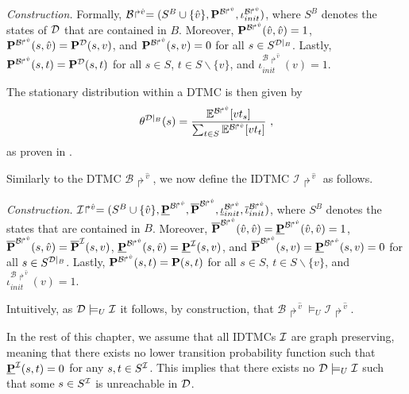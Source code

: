 \emph{Construction.} Formally, $\mathcal{B}\!\Rsh^{\hat{v}} = (S^{B} \cup \{\hat{v}\},\mathbf{P}^{\mathcal{B}\Rsh^{\hat{v}}},\iota_{init}^{\mathcal{B}\Rsh^{\hat{v}}})$, where $S^B$ denotes the states of $\mathcal{D}$ that are contained in $B$. Moreover, $\mathbf{P}^{\mathcal{B}\Rsh^{\hat{v}}}(\hat{v},\hat{v}) = 1$, $\mathbf{P}^{\mathcal{B}\Rsh^{\hat{v}}}(s,\hat{v}) = \mathbf{P}^{\mathcal{D}}(s,v)$, and $\mathbf{P}^{\mathcal{B}\Rsh^{\hat{v}}}(s,v) = 0$ for all $s\in S^{\mathcal{D}|_B}$. Lastly, $\mathbf{P}^{\mathcal{B}\Rsh^{\hat{v}}}(s,t) = \mathbf{P}^{\mathcal{D}}(s,t)$ for all $s\in S$, $t\in S\backslash\{v\}$, and $\iota_{init}^{\mathcal{B}\Rsh^{\hat{v}}}(v) = 1$. 

The stationary distribution within a DTMC is then given by
\begin{equation}\label{eq:Stat_Distr_of_BSCC}
    \theta^{\mathcal{D}|_B}(s) = \frac{\mathbb{E}^{\mathcal{B}\Rsh^{\hat{v}}}[vt_s]}{\sum_{t\in S}\mathbb{E}^{\mathcal{B}\Rsh^{\hat{v}}}[vt_t]}\ ,
\end{equation}
as proven in \cite{Computing_EVTs_Stationary_Distr_in_MCs_Mertens}.

Similarly to the DTMC $\mathcal{B}\!\Rsh^{\hat{v}}$, we now define the IDTMC $\mathcal{I}\!\Rsh^{\hat{v}}$ as follows.

\emph{Construction.} $\mathcal{I}\!\Rsh^{\hat{v}} = (S^{B} \cup \{\hat{v}\},\mathbf{\underline{P}}^{\mathcal{B}\Rsh^{\hat{v}}},\mathbf{\overline{P}}^{\mathcal{B}\Rsh^{\hat{v}}},\mathbf{\underline{\iota}}_{init}^{\mathcal{B}\Rsh^{\hat{v}}},\mathbf{\overline{\iota}}_{init}^{\mathcal{B}\Rsh^{\hat{v}}})$, where $S^B$ denotes the states that are contained in $B$. Moreover, $\mathbf{\overline{P}}^{\mathcal{B}\Rsh^{\hat{v}}}(\hat{v},\hat{v}) = \mathbf{\underline{P}}^{\mathcal{B}\Rsh^{\hat{v}}}(\hat{v},\hat{v}) = 1$, $\mathbf{\overline{P}}^{\mathcal{B}\Rsh^{\hat{v}}}(s,\hat{v}) = \mathbf{\overline{P}}^{\mathcal{I}}(s,v)$, $\mathbf{\underline{P}}^{\mathcal{B}\Rsh^{\hat{v}}}(s,\hat{v}) = \mathbf{\underline{P}}^{\mathcal{I}}(s,v)$, and $\mathbf{\overline{P}}^{\mathcal{B}\Rsh^{\hat{v}}}(s,v) = \mathbf{\underline{P}}^{\mathcal{B}\Rsh^{\hat{v}}}(s,v) = 0$ for all $s\in S^{\mathcal{D}|_B}$. Lastly, $\mathbf{P}^{\mathcal{B}\Rsh^{\hat{v}}}(s,t) = \mathbf{P}(s,t)$ for all $s\in S$, $t\in S\backslash\{v\}$, and $\iota_{init}^{\mathcal{B}\Rsh^{\hat{v}}}(v) = 1$. 

Intuitively, as $\mathcal{D} \models_U \mathcal{I}$ it follows, by construction, that $\mathcal{B}\!\Rsh^{\hat{v}} \models_U \mathcal{I}\!\Rsh^{\hat{v}}$.


\begin{assumption}\label{assmp:graph_preserving}
    In the rest of this chapter, we assume that all IDTMCs $\mathcal{I}$ are graph preserving, meaning that there exists no lower transition probability function such that $\mathbf{\underline{P}}^{\mathcal{I}}(s,t) = 0$ for any $s,t\in S^{\mathcal{I}}$. This implies that there exists no $\mathcal{D} \models_U \mathcal{I}$ such that some $s\in S^{\mathcal{I}}$ is unreachable in $\mathcal{D}$.
\end{assumption}

